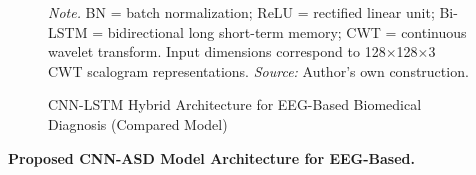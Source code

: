 \begin{figure}[!htbp]
    \vspace{0.5em}
    \caption[CNN-LSTM Hybrid Architecture]{CNN-LSTM Hybrid Architecture for EEG-Based Biomedical Diagnosis (Compared Model)}
    \label{fig:cnn_lstm_arch}
    \vspace{0.5em}
\noindent\textit{Note.} BN = batch normalization; ReLU = rectified linear unit; Bi-LSTM = bidirectional long short-term memory; CWT = continuous wavelet transform. Input dimensions correspond to 128$\times$128$\times$3 CWT scalogram representations. \textit{Source:} Author's own construction.
\end{figure}
\fi


\noindent\textbf{Proposed CNN-ASD Model Architecture for EEG-Based.}

